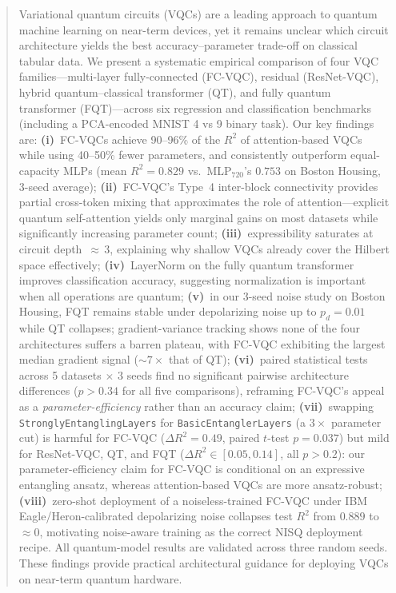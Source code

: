 \documentclass[10pt,conference]{IEEEtran}
\begin{document}
\begin{abstract}
Variational quantum circuits (VQCs) are a leading approach to quantum machine learning on near-term devices, yet it remains unclear which circuit architecture yields the best accuracy--parameter trade-off on classical tabular data.
We present a systematic empirical comparison of four VQC families---multi-layer fully-connected (FC-VQC), residual (ResNet-VQC), hybrid quantum--classical transformer (QT), and fully quantum transformer (FQT)---across six regression and classification benchmarks (including a PCA-encoded MNIST 4 vs 9 binary task).
Our key findings are:
\textbf{(i)}~FC-VQCs achieve 90--96\% of the $R^2$ of attention-based VQCs while using 40--50\% fewer parameters, and consistently outperform equal-capacity MLPs (mean $R^2{=}0.829$ vs.\ MLP$_{720}$'s $0.753$ on Boston Housing, 3-seed average);
\textbf{(ii)}~FC-VQC's Type~4 inter-block connectivity provides partial cross-token mixing that approximates the role of attention---explicit quantum self-attention yields only marginal gains on most datasets while significantly increasing parameter count;
\textbf{(iii)}~expressibility saturates at circuit depth~${\approx}\,3$, explaining why shallow VQCs already cover the Hilbert space effectively;
\textbf{(iv)}~LayerNorm on the fully quantum transformer improves classification accuracy, suggesting normalization is important when all operations are quantum;
\textbf{(v)}~in our 3-seed noise study on Boston Housing, FQT remains stable under depolarizing noise up to $p_d{=}0.01$ while QT collapses; gradient-variance tracking shows none of the four architectures suffers a barren plateau, with FC-VQC exhibiting the largest median gradient signal (${\sim}7\times$ that of QT);
\textbf{(vi)}~paired statistical tests across 5 datasets $\times$ 3 seeds find no significant pairwise architecture differences ($p{>}0.34$ for all five comparisons), reframing FC-VQC's appeal as a \emph{parameter-efficiency} rather than an accuracy claim;
\textbf{(vii)}~swapping \texttt{StronglyEntanglingLayers} for \texttt{BasicEntanglerLayers} (a $3{\times}$ parameter cut) is harmful for FC-VQC ($\Delta R^2{=}0.49$, paired $t$-test $p{=}0.037$) but mild for ResNet-VQC, QT, and FQT ($\Delta R^2 \in [0.05, 0.14]$, all $p{>}0.2$): our parameter-efficiency claim for FC-VQC is conditional on an expressive entangling ansatz, whereas attention-based VQCs are more ansatz-robust;
\textbf{(viii)}~zero-shot deployment of a noiseless-trained FC-VQC under IBM Eagle/Heron-calibrated depolarizing noise collapses test $R^2$ from $0.889$ to ${\approx}0$, motivating noise-aware training as the correct NISQ deployment recipe.
All quantum-model results are validated across three random seeds.
These findings provide practical architectural guidance for deploying VQCs on near-term quantum hardware.
\end{abstract}
\end{document}
